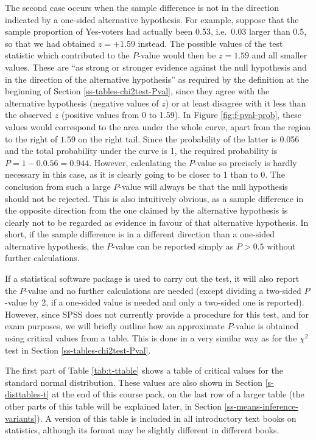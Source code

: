 \documentclass[11pt,a4paper,openany]{book}
\begin{document}
The second case occurs when the sample difference is not in the
direction indicated by a one-sided alternative hypothesis. For example,
suppose that the sample proportion of Yes-voters had actually been 0.53,
i.e.~0.03 larger than 0.5, so that we had obtained \(z=+1.59\) instead.
The possible values of the test statistic which contributed to the
\(P\)-value would then be \(z=1.59\) and all smaller values. These are
``as strong or stronger evidence against the null hypothesis and in the
direction of the alternative hypothesis'' as required by the definition
at the beginning of Section \ref{ss-tables-chi2test-Pval}, since they
agree with the alternative hypothesis (negative values of \(z\)) or at
least disagree with it less than the observed \(z\) (positive values
from 0 to 1.59). In Figure \ref{fig:f-pval-prob}, these values would
correspond to the area under the whole curve, apart from the region to
the right of \(1.59\) on the right tail. Since the probability of the
latter is 0.056 and the total probability under the curve is 1, the
required probability is \(P=1-0.0.56=0.944\). However, calculating the
\(P\)-value so precisely is hardly necessary in this case, as it is
clearly going to be closer to 1 than to 0. The conclusion from such a
large \(P\)-value will always be that the null hypothesis should not be
rejected. This is also intuitively obvious, as a sample difference in
the opposite direction from the one claimed by the alternative
hypothesis is clearly not to be regarded as evidence in favour of that
alternative hypothesis. In short, if the sample difference is in a
different direction than a one-sided alternative hypothesis, the
\(P\)-value can be reported simply as \(P>0.5\) without further
calculations.

If a statistical software package is used to carry out the test, it will
also report the \(P\)-value and no further calculations are needed
(except dividing a two-sided \(P\)-value by 2, if a one-sided value is
needed and only a two-sided one is reported). However, since SPSS does
not currently provide a procedure for this test, and for exam purposes,
we will briefly outline how an approximate \(P\)-value is obtained using
critical values from a table. This is done in a very similar way as for
the \(\chi^{2}\) test in Section \ref{ss-tables-chi2test-Pval}.

The first part of Table \ref{tab:t-ttable} shows a table of critical
values for the standard normal distribution. These values are also shown
in Section \ref{s-disttables-t} at the end of this course pack, on the
last row of a larger table (the other parts of this table will be
explained later, in Section \ref{ss-means-inference-variants}). A
version of this table is included in all introductory text books on
statistics, although its format may be slightly different in different
books.
\end{document}
